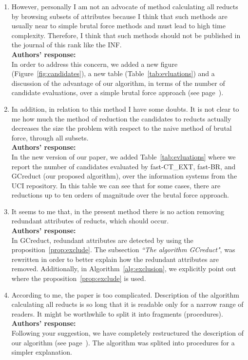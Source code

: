 \documentclass{letter}
\begin{document}
\begin{letter}{}
  \begin{enumerate}
    \item However, personally I am not  an advocate of method calculating all reducts by browsing subsets of attributes because I think that such methods are usually near to simple brutal force methods and must lead to high time complexity. Therefore, I think that such methods should not be published in the journal of this rank like the INF.\\
    \textbf{Authors’ response:} \\
    In order to address this concern, we added a new figure (Figure~\ref{fig:candidates}), a new table (Table~\ref{tab:evluations}) and a discussion of the advantage of our algorithm, in terms of the number of candidate evaluations, over a simple brutal force approach (see page~\pageref{par:brutal}).
    
    \item In addition, in relation to this method I have some doubts. It is not clear to me how much the method of reduction the candidates to reducts actually decreases the size the problem with respect to the naive method of brutal force, through all subsets.\\
    \textbf{Authors’ response:}  \\
    In the new version of our paper, we added Table~\ref{tab:evluations} where we report the number of candidates evaluated by fast-CT\_EXT, fast-BR, and GCreduct (our proposed algorithm), over the information systems from the UCI repository. In this table we can see that for some cases, there are reductions up to ten orders of magnitude over the brutal force approach.

    \item It seems to me that, in the present method there is no action removing redundant attributes of reducts, which should occur.\\
    \textbf{Authors’ response:} \\
    In GCreduct, redundant attributes are detected by using the proposition~\ref{prop:exclude}. The subsection \textit{``The algorithm GCreduct"}, was rewritten in order to better explain how the redundant attributes are removed. Additionally, in Algorithm~\ref{alg:exclusion}, we explicitly point out where the proposition~\ref{prop:exclude} is used. 

	\item According to me, the paper is too complicated. Description of the algorithm calculating all reducts is so long that it is readable only for a narrow range of readers. It might be worthwhile to split it into fragments (procedures).\\
	\textbf{Authors’ response:} \\
	Following your suggestion, we have completely restructured the description of our algorithm (see page~\pageref{description}). The algorithm was splited into procedures for a simpler explanation.


\end{enumerate}
\end{letter}
\end{document}
